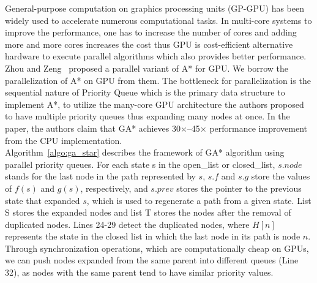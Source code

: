 \documentclass[a4paper]{article}
\begin{document}
General-purpose computation on graphics processing units (GP-GPU) has been widely used to accelerate numerous computational tasks. In multi-core systems to improve the performance, one has to increase the number of cores and adding more and more cores increases the cost thus GPU is cost-efficient alternative hardware to execute parallel algorithms which also provides better performance. Zhou and Zeng~\cite{GA*} proposed a parallel variant of A* for GPU. We borrow the parallelization of A* on GPU from them. The bottleneck for parallelization is the sequential nature of Priority Queue which is the primary data structure to implement A*, to utilize the many-core GPU architecture the authors proposed to have multiple priority queues thus expanding many nodes at once. In the paper, the authors claim that GA* achieves 30$\times$--45$\times$ performance improvement from the CPU implementation.\\
Algorithm~\ref{algo:ga_star} describes the framework of GA* algorithm using parallel priority queues. For each state s in the open\_list or closed\_list, $s.node$ stands for the last node in the path represented by $s$, $s.f$ and $s.g$ store the values of $f(s)$ and $g(s)$, respectively, and $s.prev$ stores the pointer to the previous state that expanded $s$, which is used to regenerate a path from a given state. List S stores the expanded nodes and list T stores the nodes after the removal of duplicated nodes. Lines 24-29 detect the duplicated nodes, where $H[n]$ represents the state in the closed list in which the last node in its path is node $n$. Through synchronization operations, which are computationally cheap on GPUs, we can push nodes expanded from the same parent into different queues (Line 32), as nodes with the same parent tend to have similar priority values.

\end{document}
